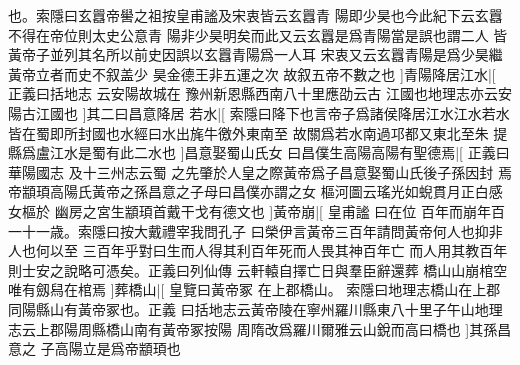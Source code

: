 也。索隱曰玄囂帝嚳之祖按皇甫謐及宋衷皆云玄囂青%
%
陽即少昊也今此紀下云玄囂不得在帝位則太史公意青%
陽非少昊明矣而此又云玄囂是爲青陽當是誤也謂二人%
%
皆黃帝子並列其名所以前史因誤以玄囂青陽爲一人耳%
宋衷又云玄囂青陽是爲少昊繼黃帝立者而史不叙盖少%
%
昊金德王非五運之次%
故叙五帝不數之也%
]青陽降居江水|[%
正義曰括地志%
云安陽故城在%
%
豫州新恩縣西南八十里應劭云古%
江國也地理志亦云安陽古江國也%
]其二曰昌意降居%
%
若水|[%
索隱曰降下也言帝子爲諸侯降居江水江水若水%
皆在蜀即所封國也水經曰水出旄牛徼外東南至%
%
故關爲若水南過邛都又東北至朱%
提縣爲盧江水是蜀有此二水也%
]昌意娶蜀山氏女%
%
曰昌僕生高陽高陽有聖德焉|[%
正義曰華陽國志%
及十三州志云蜀%
%
之先肇於人皇之際黃帝爲子昌意娶蜀山氏後子孫因封%
焉帝顓頊高陽氏黃帝之孫昌意之子母曰昌僕亦謂之女%
%
樞河圖云瑤光如蜺貫月正白感女樞於%
幽房之宮生顓頊首戴干戈有德文也%
]黃帝崩|[%
皇甫謐%
曰在位%
%
百年而崩年百一十一歳。索隱曰按大戴禮宰我問孔子%
曰榮伊言黃帝三百年請問黃帝何人也抑非人也何以至%
%
三百年乎對曰生而人得其利百年死而人畏其神百年亡%
而人用其教百年則士安之說略可憑矣。正義曰列仙傳%
%
云軒轅自擇亡日與羣臣辭還葬%
橋山山崩棺空唯有劔舄在棺焉%
]葬橋山|[%
皇覽曰黃帝冢%
在上郡橋山。%
%
索隱曰地理志橋山在上郡同陽縣山有黃帝冢也。正義%
曰括地志云黃帝陵在寧州羅川縣東八十里子午山地理%
%
志云上郡陽周縣橋山南有黃帝冢按陽%
周隋改爲羅川爾雅云山銳而高曰橋也%
]其孫昌意之%
%
子高陽立是爲帝顓頊也%
